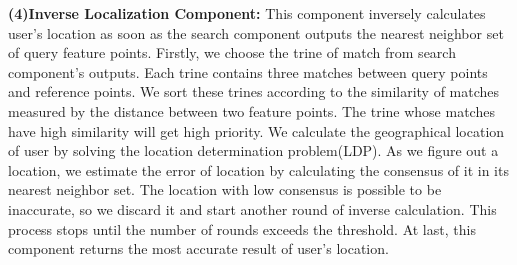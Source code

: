 \textbf{(4)Inverse Localization Component:}
This component inversely calculates user's location as soon as the search component outputs the nearest neighbor set of query feature points. Firstly, we choose the trine of match from search component's outputs. Each trine contains three matches between query points and reference points. We sort these trines according to the similarity of matches measured by the distance between two feature points. The trine whose matches have high similarity will get high priority. We calculate the geographical location of user by solving the location determination problem(LDP). As we figure out a location, we estimate the error of location by calculating the consensus of it in its nearest neighbor set. The location with low consensus is possible to be inaccurate, so we discard it and start another round of inverse calculation. This process stops until the number of rounds exceeds the threshold. At last, this component returns the most accurate result of user's location.
